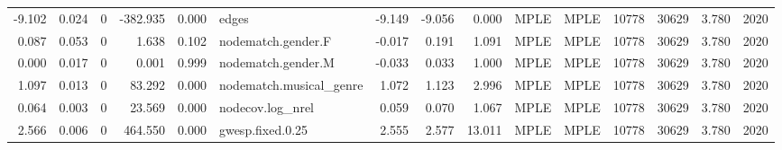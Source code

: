 \begin{table}
\begin{tabular}{rrrrrlrrrllrrrr}
   -9.102 & 0.024 &        0 & -382.935 &     0.000 &                   edges &  -9.149 &  -9.056 &  0.000 &         MPLE &   MPLE &   10778 &    30629 &     3.780 &      2020 \\
    0.087 & 0.053 &        0 &    1.638 &     0.102 &      nodematch.gender.F &  -0.017 &   0.191 &  1.091 &         MPLE &   MPLE &   10778 &    30629 &     3.780 &      2020 \\
    0.000 & 0.017 &        0 &    0.001 &     0.999 &      nodematch.gender.M &  -0.033 &   0.033 &  1.000 &         MPLE &   MPLE &   10778 &    30629 &     3.780 &      2020 \\
    1.097 & 0.013 &        0 &   83.292 &     0.000 & nodematch.musical\_genre &   1.072 &   1.123 &  2.996 &         MPLE &   MPLE &   10778 &    30629 &     3.780 &      2020 \\
    0.064 & 0.003 &        0 &   23.569 &     0.000 &        nodecov.log\_nrel &   0.059 &   0.070 &  1.067 &         MPLE &   MPLE &   10778 &    30629 &     3.780 &      2020 \\
    2.566 & 0.006 &        0 &  464.550 &     0.000 &        gwesp.fixed.0.25 &   2.555 &   2.577 & 13.011 &         MPLE &   MPLE &   10778 &    30629 &     3.780 &      2020 \\
\bottomrule
\end{tabular}
\end{table}

